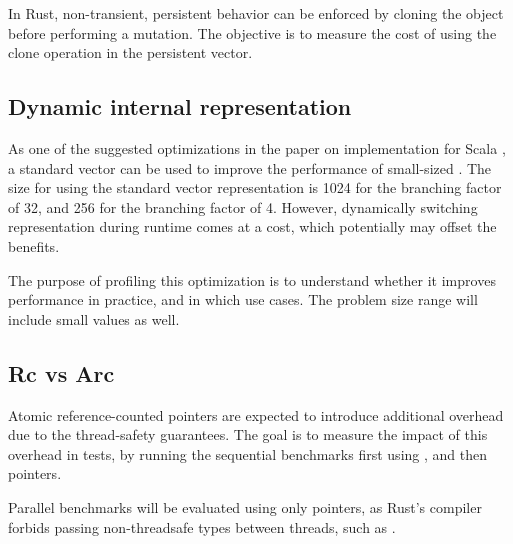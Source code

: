 In Rust, non-transient, persistent behavior can be enforced by cloning the object before performing a mutation. The objective is to measure the cost of using the clone operation in the persistent vector.



\subsection{Dynamic internal representation}
As one of the suggested optimizations in the paper on \rrbvec{} implementation for Scala \cite{rrb-vector-practical-general-purpose-im-sequence}, a standard vector can be used to improve the performance of small-sized \rrbvec{}. The size for using the standard vector representation is 1024 for the branching factor of 32, and 256 for the branching factor of 4. However, dynamically switching representation during runtime comes at a cost, which potentially may offset the benefits.

The purpose of profiling this optimization is to understand whether it improves performance in practice, and in which use cases. The problem size range will include small values as well.

\subsection{Rc vs Arc}
Atomic reference-counted pointers are expected to introduce additional overhead due to the thread-safety guarantees. The goal is to measure the impact of this overhead in tests, by running the sequential benchmarks first using \rc{}, and then \arc{} pointers.

Parallel benchmarks will be evaluated using only \arc{} pointers, as Rust's compiler forbids passing non-threadsafe types between threads, such as \rc{}.

